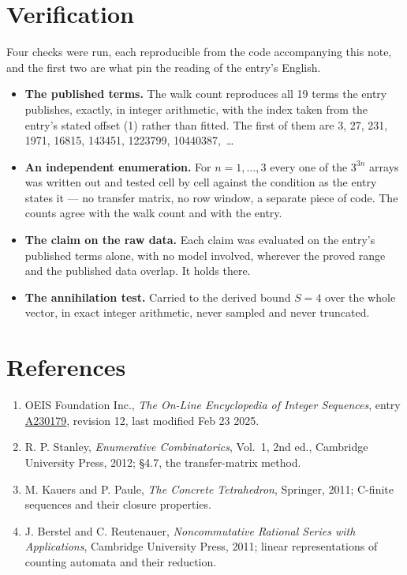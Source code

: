 \documentclass[11pt]{article}
\theoremstyle{definition}
\begin{document}
\section{Verification}

Four checks were run, each reproducible from the code accompanying this note, and the first two are what pin the reading of the entry's English.

\begin{itemize}

\item {\bfseries The published terms.} The walk count reproduces all 19 terms the entry publishes, exactly, in integer arithmetic, with the index taken from the entry's stated offset (1) rather than fitted. The first of them are 3, 27, 231, 1971, 16815, 143451, 1223799, 10440387,~\dots

\item {\bfseries An independent enumeration.} For $n = 1,\dots,3$ every one of the $3^{3n}$ arrays was written out and tested cell by cell against the condition as the entry states it --- no transfer matrix, no row window, a separate piece of code. The counts agree with the walk count and with the entry.

\item {\bfseries The claim on the raw data.} Each claim was evaluated on the entry's published terms alone, with no model involved, wherever the proved range and the published data overlap. It holds there.

\item {\bfseries The annihilation test.} Carried to the derived bound $S = 4$ over the whole vector, in exact integer arithmetic, never sampled and never truncated.

\end{itemize}

\section{References}

\begin{enumerate}

\item OEIS Foundation Inc., \emph{The On-Line Encyclopedia of Integer Sequences}, entry \href{https://oeis.org/A230179}{A230179}, revision 12, last modified Feb 23 2025.

\item R. P. Stanley, \emph{Enumerative Combinatorics}, Vol.~1, 2nd ed., Cambridge University Press, 2012; \S4.7, the transfer-matrix method.

\item M. Kauers and P. Paule, \emph{The Concrete Tetrahedron}, Springer, 2011; C-finite sequences and their closure properties.

\item J. Berstel and C. Reutenauer, \emph{Noncommutative Rational Series with Applications}, Cambridge University Press, 2011; linear representations of counting automata and their reduction.

\end{enumerate}
\end{document}
